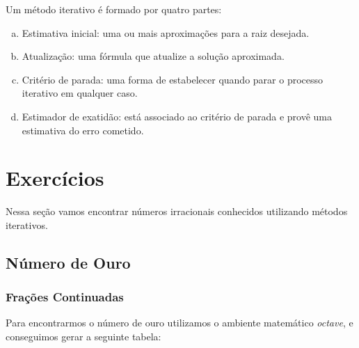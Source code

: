 \documentclass[a4paper]{article}
\begin{document}
Um método iterativo é formado por quatro partes:~\cite{claudio2000calculo}
\begin{enumerate}[a)]
	\item Estimativa inicial: uma ou mais aproximações para a raiz desejada.
    \item Atualização: uma fórmula que atualize a solução aproximada.
    \item Critério de parada: uma forma de estabelecer quando parar o processo iterativo em qualquer caso.
    \item Estimador de exatidão: está associado ao critério de parada e provê uma estimativa do erro cometido.
\end{enumerate}

\newpage

\section{Exercícios}
Nessa seção vamos encontrar números irracionais conhecidos utilizando métodos iterativos.

\subsection{Número de Ouro}

\subsubsection{Frações Continuadas}

Para encontrarmos o número de ouro utilizamos o ambiente matemático \emph{octave}, e conseguimos gerar a seguinte tabela:
\end{document}
